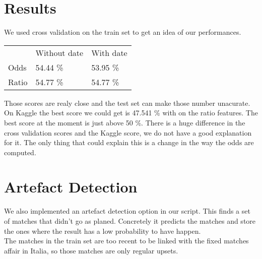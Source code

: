 \documentclass[11pt]{article}
\begin{document}
\section{Results}

We used cross validation on the train set to get an idea of our performances.
	\begin{center}
		\begin{tabular}{lll}
			 & Without date & With date\\
			 Odds & 54.44 \% & 53.95 \%\\
			 Ratio & 54.77 \% & 54.77 \%\\
		\end{tabular}	
	\end{center}
Those scores are realy close and the test set can make those number unacurate.
On Kaggle the best score we could get is 47.541 \% with on the ratio features. The best score at the moment is just above 50 \%.
There is a huge difference in the cross validation scores and the Kaggle score, we do not have a good explanation for it. The only thing that could explain this is a change in the way the odds are computed.

\section{Artefact Detection}

We also implemented an artefact detection option in our script. This finds a set of matches that didn't go as planed. Concretely it predicts the matches and store the ones where the result has a low probability to have happen.\\
The matches in the train set are too recent to be linked with the fixed matches affair in Italia, so those matches are only regular upsets.
	
\end{document}
